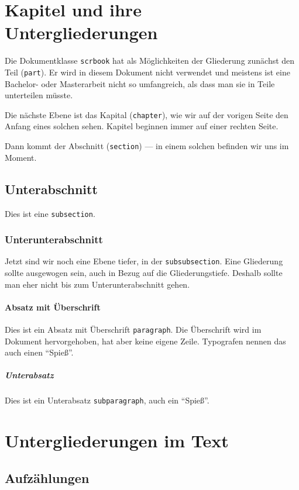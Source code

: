 \section{Kapitel und ihre Untergliederungen}

Die Dokumentklasse \verb=scrbook= hat als Möglichkeiten der Gliederung
zunächst den Teil (\verb=part=). Er wird in diesem Dokument nicht
verwendet und meistens ist eine Bachelor- oder Masterarbeit nicht so
umfangreich, als dass man sie in Teile unterteilen müsste.

Die nächste Ebene ist das Kapital (\verb=chapter=), wie wir auf der
vorigen Seite den Anfang eines solchen sehen. Kapitel beginnen immer auf
einer rechten Seite.

Dann kommt der Abschnitt (\verb=section=) --- in einem solchen befinden wir
uns im Moment.

\subsection{Unterabschnitt}

Dies ist eine \verb=subsection=.

\subsubsection{Unterunterabschnitt}

Jetzt sind wir noch eine Ebene tiefer, in der \verb=subsubsection=. Eine
Gliederung sollte ausgewogen sein, auch in Bezug auf die
Gliederungstiefe. Deshalb sollte man eher nicht bis zum
Unterunterabschnitt gehen.


\paragraph{Absatz mit Überschrift}

Dies ist ein Absatz mit Überschrift \verb=paragraph=. Die Überschrift
wird im Dokument hervorgehoben, hat aber keine eigene Zeile. Typografen
nennen das auch einen \enquote{Spieß}.

\subparagraph{Unterabsatz}

Dies ist ein Unterabsatz \verb=subparagraph=, auch ein \enquote{Spieß}.

\section{Untergliederungen im Text}

\subsection{Aufzählungen}

